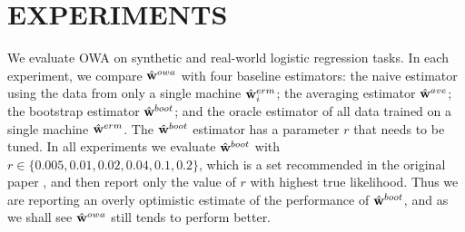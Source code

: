 \documentclass[thesis.tex]{subfiles}
\begin{document}

\section{EXPERIMENTS}
\label{sec:exp}


We evaluate OWA on synthetic and real-world logistic regression tasks.
In each experiment, we compare $\hat{\mathbf w}^{owa}$ with four baseline estimators:
the naive estimator using the data from only a single machine $\hat{\mathbf w}^{erm}_i$;
the averaging estimator $\hat{\mathbf w}^{ave}$;
the bootstrap estimator $\hat{\mathbf w}^{boot}$;
and the oracle estimator of all data trained on a single machine $\hat{\mathbf w}^{erm}$.
The $\hat{\mathbf w}^{boot}$ estimator has a parameter $r$ that needs to be tuned.
In all experiments we evaluate $\hat{\mathbf w}^{boot}$ with $r \in \{0.005,0.01,0.02,0.04,0.1,0.2\}$,
which is a set recommended in the original paper \citep{zhang2012communication},
and then report only the value of $r$ with highest true likelihood.
Thus we are reporting an overly optimistic estimate of the performance of $\hat{\mathbf w}^{boot}$,
and as we shall see $\hat{\mathbf w}^{owa}$ still tends to perform better.


\end{document}
